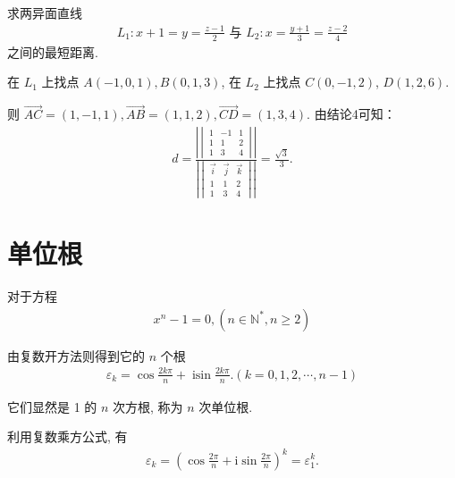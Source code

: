 \begin{exercise}
	求两异面直线
	\begin{align*}
		L_1: x+1=y=\frac{z-1}{2} \text { 与 } L_2: x=\frac{y+1}{3}=\frac{z-2}{4}
	\end{align*}
	之间的最短距离.
\end{exercise}
\begin{solution}
	在 $L_1$ 上找点 $A(-1,0,1), B(0,1,3)$, 在 $L_2$ 上找点 $C(0,-1,2)$, $D(1,2,6)$.

	则 $\overrightarrow{A C}=(1,-1,1), \overrightarrow{A B}=(1,1,2), \overrightarrow{C D}=(1,3,4)$. 由结论4可知：
	\begin{align*}
		d=\frac{\left| \begin{vmatrix}
				               1 & -1 & 1 \\
				               1 & 1  & 2 \\
				               1 & 3  & 4
			               \end{vmatrix} \right|}{\left| \begin{vmatrix}
				                                             \vec{i} & \vec{j} & \vec{k} \\
				                                             1       & 1       & 2       \\
				                                             1       & 3       & 4
			                                             \end{vmatrix} \right|}=\frac{\sqrt{3}}{3} .
	\end{align*}
\end{solution}


\section{单位根}
对于方程
\begin{align*}
	x^n-1=0,\left(n \in \mathbb{N}^*, n \geqslant 2\right)
\end{align*}

由复数开方法则得到它的 $n$ 个根
\begin{align*}
	\varepsilon_k=\cos \frac{2 k \pi}{n}+\operatorname{isin} \frac{2 k \pi}{n} .(k=0,1,2, \cdots, n-1)
\end{align*}

它们显然是 1 的 $n$ 次方根, 称为 $n$ 次单位根.

利用复数乘方公式, 有
\begin{align*}
	\varepsilon_k=\left(\cos \frac{2 \pi}{n}+\mathrm{i} \sin \frac{2 \pi}{n}\right)^k=\varepsilon_1^k .
\end{align*}

